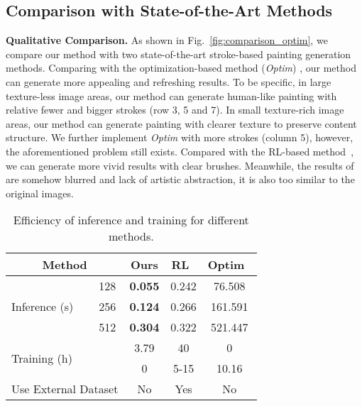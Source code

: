 \documentclass[10pt,twocolumn,letterpaper]{article}
\begin{document}
\subsection{Comparison with State-of-the-Art Methods}

\noindent
\textbf{Qualitative Comparison.}
As shown in Fig.~\ref{fig:comparison_optim}, we compare our method with two state-of-the-art stroke-based painting generation methods.
Comparing with the optimization-based method (\emph{Optim}) \cite{zou2020stylized}, our method can generate more appealing and refreshing results. To be specific, in large texture-less image areas, our method can generate human-like painting with relative fewer and bigger strokes (row 3, 5 and 7). In small texture-rich image areas, our method can generate painting with clearer texture to preserve content structure. We further implement \emph{Optim} with more strokes (column 5), however, the aforementioned problem still exists.
Compared with the RL-based method~\cite{huang2019learning}, we can generate more vivid results with clear brushes. Meanwhile, the results of \cite{huang2019learning} are somehow blurred and lack of artistic abstraction, it is also too similar to the original images. 

\begin{table}[!t]
\centering
    \begin{tabular}{lcccc}
        \toprule
        \multicolumn{2}{c}{Method} & Ours & RL~\cite{huang2019learning} & Optim~\cite{zou2020stylized} \\
        \midrule
        \multirow{3}{2cm}{Inference (s)} & 128 & \textbf{0.055} & 0.242 & 76.508 \\
        \cline{2-5}
        & 256 & \textbf{0.124} & 0.266 & 161.591 \\
        \cline{2-5}
        & 512 & \textbf{0.304} & 0.322 & 521.447 \\
        \hline
        \multirow{2}{2cm}{Training (h)} &  & 3.79 & 40 & 0 \\
        \cline{2-5}
        &  & 0 & 5-15 & 10.16 \\
        \hline
        \multicolumn{2}{c}{Use External Dataset} & No & Yes & No \\
        \bottomrule
    \end{tabular}
    \vspace{0.3cm}
    \caption{Efficiency of inference and training for different methods.}
    \label{table:efficiency}
    \vspace{-0.2cm}
\end{table}
\end{document}
